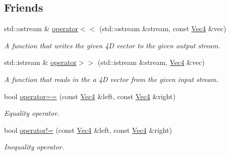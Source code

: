 \subsection*{Friends}
\begin{DoxyCompactItemize}
\item 
std\+::ostream \& \hyperlink{classgfxmath_1_1_vec4_a31c794bedecdf686aae40b9261ea38c5}{operator$<$$<$} (std\+::ostream \&stream, const \hyperlink{classgfxmath_1_1_vec4}{Vec4} \&vec)
\begin{DoxyCompactList}\small\item\em A function that writes the given 4\+D vector to the given output stream. \end{DoxyCompactList}\item 
std\+::istream \& \hyperlink{classgfxmath_1_1_vec4_ab5d34a5bf6bb543ab690436fc45c7319}{operator$>$$>$} (std\+::istream \&stream, \hyperlink{classgfxmath_1_1_vec4}{Vec4} \&vec)
\begin{DoxyCompactList}\small\item\em A function that reads in the a 4\+D vector from the given input stream. \end{DoxyCompactList}\item 
bool \hyperlink{classgfxmath_1_1_vec4_a75ec0a4eb1bdb2abb83280b62f2e94d3}{operator==} (const \hyperlink{classgfxmath_1_1_vec4}{Vec4} \&left, const \hyperlink{classgfxmath_1_1_vec4}{Vec4} \&right)
\begin{DoxyCompactList}\small\item\em Equality operator. \end{DoxyCompactList}\item 
bool \hyperlink{classgfxmath_1_1_vec4_a8ddc017b9087be64efa4fc76f1f63a12}{operator!=} (const \hyperlink{classgfxmath_1_1_vec4}{Vec4} \&left, const \hyperlink{classgfxmath_1_1_vec4}{Vec4} \&right)
\begin{DoxyCompactList}\small\item\em Inequality operator. \end{DoxyCompactList}\end{DoxyCompactItemize}
